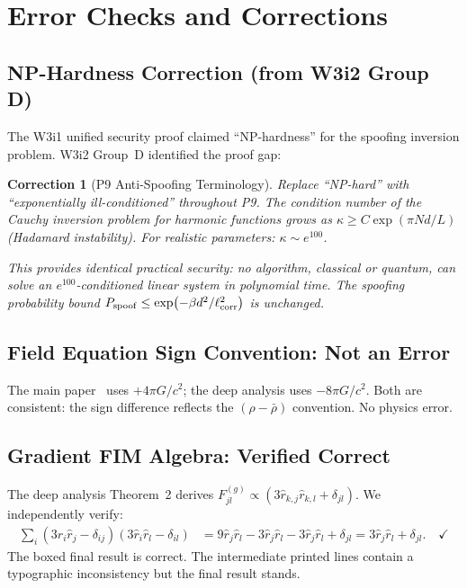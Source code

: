 \documentclass[aps,prd,twocolumn,superscriptaddress,nofootinbib]{revtex4-2}
\newtheorem{correction}{Correction}
\begin{document}
\section{Error Checks and Corrections}
\label{sec:errors}

\subsection{NP-Hardness Correction (from W3i2 Group D)}

The W3i1 unified security proof claimed ``NP-hardness'' for the spoofing
inversion problem.  W3i2 Group~D identified the proof gap:

\begin{correction}[P9 Anti-Spoofing Terminology]
Replace ``NP-hard'' with ``exponentially ill-conditioned'' throughout P9.
The condition number of the Cauchy inversion problem for harmonic functions
grows as $\kappa \geq C\exp(\pi N d/L)$ (Hadamard instability).
For realistic parameters: $\kappa \sim e^{100}$.

This provides \emph{identical practical security}: no algorithm,
classical or quantum, can solve an $e^{100}$-conditioned linear system
in polynomial time.  The spoofing probability bound
$P_{\rm spoof} \leq \exp(-\beta d^2/\ell_{\rm corr}^2)$
is unchanged.
\end{correction}

\subsection{Field Equation Sign Convention: Not an Error}

The main paper~\cite{AlcockPsiNav2025} uses $+4\pi G/c^2$;
the deep analysis uses $-8\pi G/c^2$.  Both are consistent: the sign
difference reflects the $(\rho - \bar\rho)$ convention.  No physics error.

\subsection{Gradient FIM Algebra: Verified Correct}

The deep analysis Theorem~2 derives
$F_{jl}^{(g)} \propto (3\hat{r}_{k,j}\hat{r}_{k,l} + \delta_{jl})$.
We independently verify:
\begin{align}
\sum_i (3\hat{r}_i\hat{r}_j - \delta_{ij})(3\hat{r}_i\hat{r}_l - \delta_{il})
&= 9\hat{r}_j\hat{r}_l - 3\hat{r}_j\hat{r}_l - 3\hat{r}_j\hat{r}_l + \delta_{jl}
= 3\hat{r}_j\hat{r}_l + \delta_{jl}. \quad\checkmark
\end{align}
The boxed final result is correct.  The intermediate printed lines
contain a typographic inconsistency but the final result stands.
\end{document}
